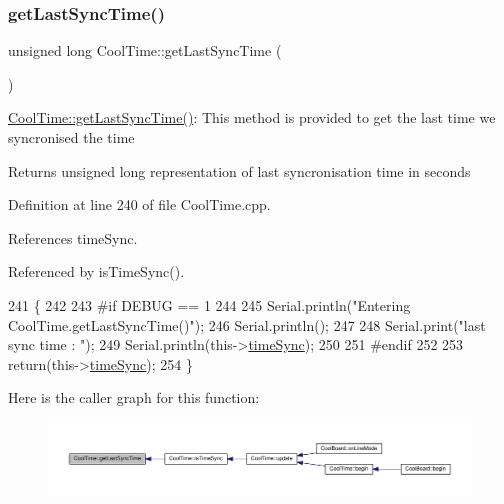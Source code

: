 \subsubsection{\texorpdfstring{get\+Last\+Sync\+Time()}{getLastSyncTime()}}
{\footnotesize\ttfamily unsigned long Cool\+Time\+::get\+Last\+Sync\+Time (\begin{DoxyParamCaption}{ }\end{DoxyParamCaption})}

\hyperlink{classCoolTime_a5d17f707a9d337720493b2bce9d41c21}{Cool\+Time\+::get\+Last\+Sync\+Time()}\+: This method is provided to get the last time we syncronised the time

\begin{DoxyReturn}{Returns}
unsigned long representation of last syncronisation time in seconds 
\end{DoxyReturn}


Definition at line 240 of file Cool\+Time.\+cpp.



References time\+Sync.



Referenced by is\+Time\+Sync().


\begin{DoxyCode}
241 \{
242 
243 \textcolor{preprocessor}{#if DEBUG == 1 }
244 
245     Serial.println(\textcolor{stringliteral}{"Entering CoolTime.getLastSyncTime()"});
246     Serial.println();
247     
248     Serial.print(\textcolor{stringliteral}{"last sync time : "});
249     Serial.println(this->\hyperlink{classCoolTime_a9d032e76c3470a15b3bbbc52af6463f7}{timeSync});
250 
251 \textcolor{preprocessor}{#endif }
252 
253     \textcolor{keywordflow}{return}(this->\hyperlink{classCoolTime_a9d032e76c3470a15b3bbbc52af6463f7}{timeSync});
254 \}
\end{DoxyCode}
Here is the caller graph for this function\+:
\nopagebreak
\begin{figure}[H]
\begin{center}
\leavevmode
\includegraphics[width=350pt]{classCoolTime_a5d17f707a9d337720493b2bce9d41c21_icgraph}
\end{center}
\end{figure}
\mbox{\label{classCoolTime_a41fbbbfd651c2079f54d4b2911e4c705}} 
